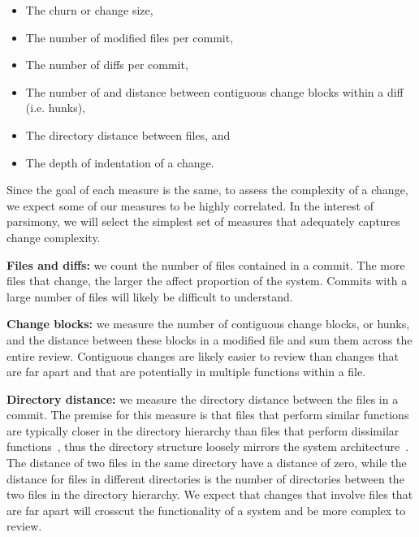 \documentclass[8pt,twocolumn,a4paper]{article}
\newcommand*{\ie}{i.e. }
\begin{document}
\begin{itemize}

\item The churn or change size, 

\item The number of modified files per commit,

\item The number of diffs per commit, 

\item The number of and distance between contiguous change blocks within a diff
(\ie hunks), 

\item The directory distance between files, and 

\item The depth of indentation of a change. 

\end{itemize}

%
Since the goal of each measure is the same, to assess the complexity of a
change, we expect some of our measures to be highly correlated. 
In the interest of parsimony, we will select the simplest set of measures that adequately captures change complexity. 

{\bf Files and diffs:} we count the number of files contained in a commit. The more files that change, the larger the affect proportion of the system. Commits with a large number of files will likely be difficult to understand. 

{\bf Change blocks:} we measure the number of contiguous change blocks, or
hunks, and the distance between these blocks in a modified file and sum them
across the entire review.  Contiguous changes  are likely easier to review than
changes that are far apart and that are potentially in multiple functions
within a file.  

{\bf Directory distance:} we measure the directory distance between the files
in a commit. The premise for this measure is that files that perform similar
functions are typically closer in the directory hierarchy than files that
perform dissimilar functions~\cite{Bowman1999ICSE}, thus the directory
structure loosely mirrors the system architecture~\cite{RigbySubTOSEM}. The
distance of two files in the same directory have a distance of zero, while the
distance for files in different directories is the number of directories
between the two files in the directory hierarchy.  We expect that changes that
involve files that are far apart will crosscut the functionality of a system
and be more complex to review.
\end{document}
